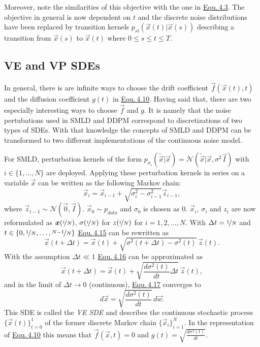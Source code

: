 Moreover, note the similarities of this objective with the one in \hyperref[equ:4.3]{Equ.\,4.3}. The objective in general is now dependent on $t$ and the discrete noise distributions have been replaced by transition kernels $p_{st}(\vec{x}(t)|\vec{x}(s))$ describing a transition from $\vec{x}(s)$ to $\vec{x}(t)$ where $0\leq s \leq t \leq T$.
%
\subsection{VE and VP SDEs} \label{sec:4.4.4}
In general, there is are infinite ways to choose the drift coefficient $\vec{f}(\vec{x}(t),t)$ and the diffusion coefficient $g(t)$ in \hyperref[equ:4.10]{Equ.\,4.10}. Having said that, there are two especially interesting ways to choose $\vec{f}$ and $g$. It is namely that the noise pertubations used in SMLD and DDPM correspond to discretizations of two types of SDEs. With that knowledge the concepts of SMLD and DDPM can be transformed to two different implementations of the continuous noise model.

For SMLD, perturbation kernels of the form $p_{\sigma_i}(\tilde{\vec{x}}|\vec{x})=\mathcal{N}(\tilde{\vec{x}}|\vec{x},\sigma^2\vec{I})$ with $i\in\{1,\dots,N\}$ are deployed. Applying these perturbation kernels in series on a variable $\vec{x}$ can be written as the following Markov chain:
%
\begin{equation} \label{equ:4.15}
    \vec{x}_i=\vec{x}_{i-1}+\sqrt{\sigma_i^2-\sigma_{i-1}^2}\vec{z}_{i-1},
\end{equation}
%
where $\vec{z}_{i-1}\sim\mathcal{N}(\vec{0},\vec{I})$. $\vec{x}_0\sim p_{data}$ and $\sigma_0$ is chosen as $0$. $\vec{x}_i$, $\sigma_i$ and $z_i$ are now reformulated as $\vec{x}(\nicefrac{i}{N})$, $\sigma(\nicefrac{i}{N})$ for $z(\nicefrac{i}{N})$ for $i=1,2,\dots,N$. With $\Delta t=\nicefrac{1}{N}$ and $t\in\{0,\nicefrac{1}{N},\dots,\nicefrac{N-1}{N}\}$ \hyperref[equ:4.15]{Equ.\,4.15} can be rewritten as
%
\begin{equation} \label{equ:4.16}
    \vec{x}(t+\Delta t)=\vec{x}(t)+\sqrt{\sigma^2(t+\Delta t)-\sigma^2(t)}\,\vec{z}(t).
\end{equation}
%
With the assumption $\Delta t \ll 1$ \hyperref[equ:4.16]{Equ.\,4.16} can be approximated as 
%
\begin{equation} \label{equ:4.17}
    \vec{x}(t+\Delta t)=\vec{x}(t)+\sqrt{\frac{d\sigma^2(t)}{dt}\Delta t}\,\vec{z}(t),
\end{equation}
%
and in the limit of $\Delta t\rightarrow 0$ (continuous), \hyperref[equ:4.17]{Equ.\,4.17} converges to 
%
\begin{equation} \label{equ:4.18}
    d\vec{x}=\sqrt{\frac{d\sigma^2(t)}{dt}}\,d\vec{w}.
\end{equation}
%
This SDE is called the \textit{VE SDE} and describes the continuous stochastic process $\{\vec{x}(t)\}_{t=0}^1$ of the former discrete Markov chain $\{\vec{x}_i\}_{i=1}^N$. In the representation of \hyperref[equ:4.10]{Equ.\,4.10} this means that $\vec{f}(\vec{x},t)=0$ and $g(t)=\sqrt{\frac{d\sigma^2(t)}{dt}}$.

